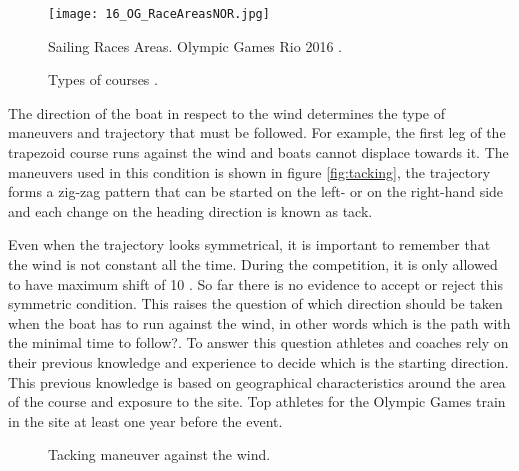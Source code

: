 \begin{figure}[ht]
\centering
 \texttt{[image: 16\_OG\_RaceAreasNOR.jpg]}
  \caption{Sailing Races Areas. Olympic Games Rio 2016 \cite{instr_rio}.}
\label{fig:olymp_areas_rio} 
\end{figure}

\begin{figure}[ht]
  \centering
  \hfill
  \caption{Types of courses \cite{instr_rio}.}
\label{fig:typecourses} 
\end{figure}

The direction of the boat in respect to the wind determines the type of maneuvers and trajectory that must be followed. For example, the first leg of the trapezoid course runs against the wind and boats cannot displace towards it. The maneuvers used in this condition is shown in figure \ref{fig:tacking}, the trajectory forms a zig-zag pattern that can be started on the left- or on the right-hand side and each change on the heading direction is known as tack. \par 

Even when the trajectory looks symmetrical, it is important to remember that the wind is not constant all the time. During the competition, it is only allowed to have maximum shift of 10 \degree \cite{race_pol}. So far there is no evidence to accept or reject this symmetric condition. This raises the question of which direction should be taken when the boat has to run against the wind, in other words which is the path with the minimal time to follow?. To answer this question athletes and coaches rely on their previous knowledge and experience to decide which is the starting direction. This previous knowledge is based on geographical characteristics around the area of the course and exposure to the site. Top athletes for the Olympic Games train in the site at least one year before the event.\par 
\begin{figure}[ht]
  \centering
  \hfill
   \centering
  \caption{Tacking maneuver against the wind.}
\label{fig:tack_against_wind} 
\end{figure}

